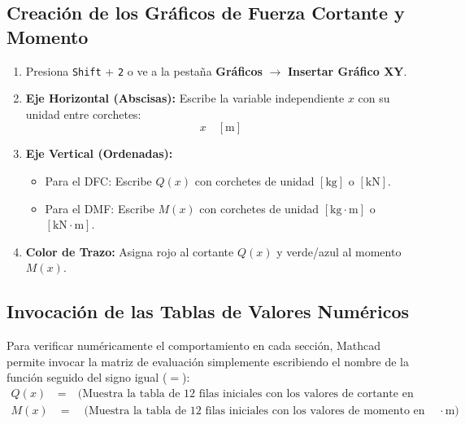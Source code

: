 \documentclass[10pt,a4paper]{article}
\begin{document}
\subsection{Creación de los Gráficos de Fuerza Cortante y Momento}
\begin{enumerate}[leftmargin=*,itemsep=2pt]
    \item Presiona \texttt{Shift} + \texttt{2} o ve a la pestaña \textbf{Gráficos} $\rightarrow$ \textbf{Insertar Gráfico XY}.
    \item \textbf{Eje Horizontal (Abscisas):} Escribe la variable independiente $x$ con su unidad entre corchetes:
          \begin{equation*}
              x \quad [\text{m}]
          \end{equation*}
    \item \textbf{Eje Vertical (Ordenadas):}
          \begin{itemize}
              \item Para el DFC: Escribe $Q(x)$ con corchetes de unidad $[\text{kg}]$ o $[\text{kN}]$.
              \item Para el DMF: Escribe $M(x)$ con corchetes de unidad $[\text{kg}\cdot\text{m}]$ o $[\text{kN}\cdot\text{m}]$.
          \end{itemize}
    \item \textbf{Color de Trazo:} Asigna rojo al cortante $Q(x)$ y verde/azul al momento $M(x)$.
\end{enumerate}

\subsection{Invocación de las Tablas de Valores Numéricos}
Para verificar numéricamente el comportamiento en cada sección, Mathcad permite invocar la matriz de evaluación simplemente escribiendo el nombre de la función seguido del signo igual ($=$):
\begin{align*}
    Q(x) &= \quad \text{(Muestra la tabla de 12 filas iniciales con los valores de cortante en kg)} \\
    M(x) &= \quad \text{(Muestra la tabla de 12 filas iniciales con los valores de momento en kg}\cdot\text{m)}
\end{align*}

\vspace{6pt}

\end{document}
